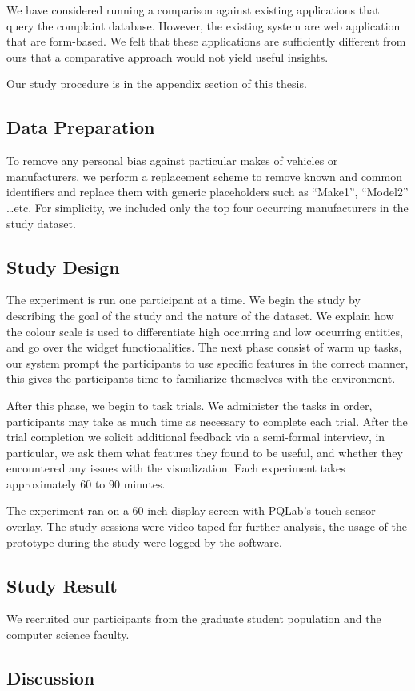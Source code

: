 We have considered running a comparison against existing applications that query
the complaint database. However, the existing system are web application that
are form-based. We felt that these applications are sufficiently different from
ours that a comparative approach would not yield useful insights.

Our study procedure is in the appendix section of this thesis.


\subsection{Data Preparation}
To remove any personal bias against particular makes of vehicles or
manufacturers, we perform a replacement scheme to remove known and common
identifiers and replace them with generic placeholders such as ``Make1'',
``Model2'' \ldots etc. For simplicity, we included only the top four occurring
manufacturers in the study dataset.

 
\subsection{Study Design}
The experiment is run one participant at a time. We begin the study by
describing the goal of the study and the nature of the dataset. We explain how
the colour scale is used to differentiate high occurring and low occurring
entities, and go over the widget functionalities. The next phase consist of warm
up tasks, our system prompt the participants to use specific features in the
correct manner, this gives the participants time to familiarize themselves with
the environment.

After this phase, we begin to task trials. We administer the tasks in order,
participants may take as much time as necessary to complete each trial. After
the trial completion we solicit additional feedback via a semi-formal interview,
in particular, we ask them what features they found to be useful, and whether
they encountered any issues with the visualization. Each experiment takes
approximately 60 to 90 minutes.

The experiment ran on a 60 inch display screen with PQLab's touch sensor
overlay. The study sessions were video taped for further analysis, the usage of
the prototype during the study were logged by the software.

\subsection{Study Result}
We recruited our participants from the graduate student population and the
computer science faculty.

\subsection{Discussion}